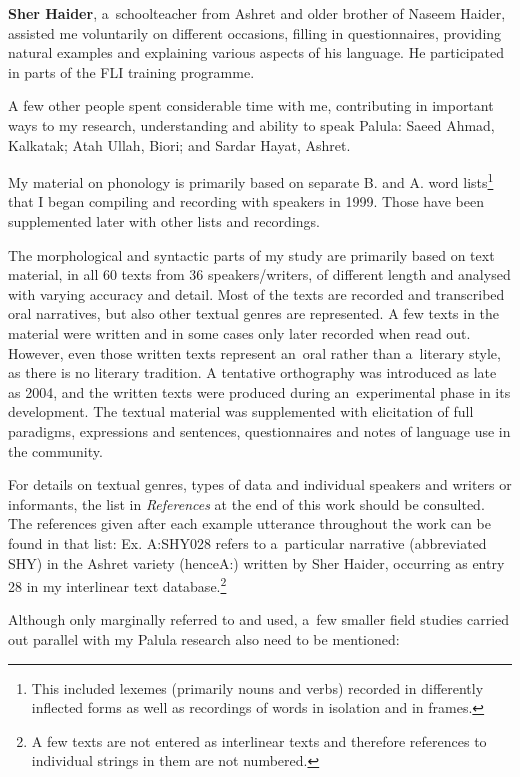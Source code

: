 \textbf{Sher Haider}, a~schoolteacher from Ashret and older brother of Naseem Haider, assisted me
voluntarily on different occasions, filling in questionnaires, providing natural examples and
explaining various aspects of his language. He participated in parts of the FLI training programme.


A few other people spent considerable time with me, contributing in important ways to my research,
understanding and ability to speak Palula: Saeed Ahmad, Kalkatak; Atah Ullah, Biori; and Sardar
Hayat, Ashret.


My material on phonology is primarily based on separate B. and A. word lists\footnote{This included
  lexemes (primarily nouns and verbs) recorded in differently inflected forms as well as recordings
  of words in isolation and in frames.} that I began compiling and recording with speakers in
1999. Those have been supplemented later with other lists and recordings.


The morphological and syntactic parts of my study are primarily based on text material, in all 60
texts from 36 speakers/writers, of different length and analysed with varying accuracy and
detail. Most of the texts are recorded and transcribed oral narratives, but also other textual
genres are represented. A few texts in the material were written and in some cases only later
recorded when read out. However, even those written texts represent an~oral rather than a~literary
style, as there is no literary tradition. A tentative orthography was introduced as late as 2004,
and the written texts were produced during an~experimental phase in its development. The textual
material was supplemented with elicitation of full paradigms, expressions and sentences,
questionnaires and notes of language use in the community.


For details on textual genres, types of data and individual speakers and writers or informants, the
list in \textit{References} at the end of this work should be consulted. The references given after
each example utterance throughout the work can be found in that list: Ex. A:SHY028 refers to
a~particular narrative (abbreviated SHY) in the Ashret variety (henceA:) written by Sher Haider, occurring as entry 28 in my interlinear text database.\footnote{A few texts are not entered as interlinear texts and therefore references to individual strings in them are not numbered.}


Although only marginally referred to and used, a~few smaller field studies carried out parallel with
my Palula research also need to be mentioned:


